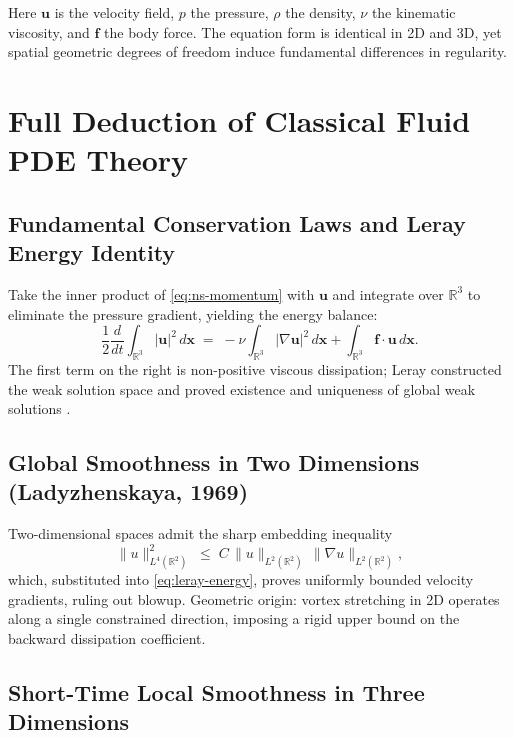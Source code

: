\documentclass[11pt,a4paper]{article}
\theoremstyle{remark}
\newcommand{\uvec}{\bm{u}}
\newcommand{\pvec}{\bm{f}}
\begin{document}
Here $\uvec$ is the velocity field, $p$ the pressure, $\rho$ the density, $\nu$ the kinematic viscosity, and $\pvec$ the body force. The equation form is identical in 2D and 3D, yet spatial geometric degrees of freedom induce fundamental differences in regularity.

\section{Full Deduction of Classical Fluid PDE Theory}\label{sec:classical}

\subsection{Fundamental Conservation Laws and Leray Energy Identity}\label{sec:leray}

Take the inner product of \eqref{eq:ns-momentum} with $\uvec$ and integrate over $\mathbb{R}^{3}$ to eliminate the pressure gradient, yielding the energy balance:
\begin{equation}\label{eq:leray-energy}
\frac{1}{2}\frac{d}{dt}\int_{\mathbb{R}^{3}}|\uvec|^{2}\,d\bm{x}
\;=\; -\nu\int_{\mathbb{R}^{3}}|\nabla\uvec|^{2}\,d\bm{x}
+ \int_{\mathbb{R}^{3}}\pvec\!\cdot\!\uvec\,d\bm{x}.
\end{equation}
The first term on the right is non-positive viscous dissipation; Leray constructed the weak solution space and proved existence and uniqueness of global weak solutions \citep{Leray1934}.

\subsection{Global Smoothness in Two Dimensions (Ladyzhenskaya, 1969)}\label{sec:2d}

Two-dimensional spaces admit the sharp embedding inequality
\begin{equation}\label{eq:2d-embedding}
\|u\|_{L^{4}(\mathbb{R}^{2})}^{2} \;\le\; C\,\|u\|_{L^{2}(\mathbb{R}^{2})}\,\|\nabla u\|_{L^{2}(\mathbb{R}^{2})},
\end{equation}
which, substituted into \eqref{eq:leray-energy}, proves uniformly bounded velocity gradients, ruling out blowup. Geometric origin: vortex stretching in 2D operates along a single constrained direction, imposing a rigid upper bound on the backward dissipation coefficient.

\subsection{Short-Time Local Smoothness in Three Dimensions}\label{sec:3d-short}
\end{document}
